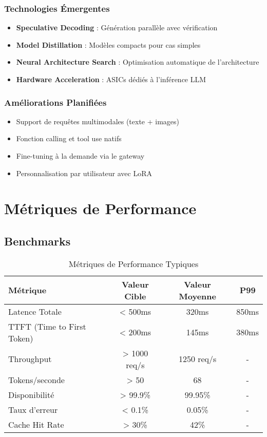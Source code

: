 \documentclass[12pt,a4paper]{article}
\begin{document}
\subsubsection{Technologies Émergentes}
\begin{itemize}[noitemsep]
    \item \textbf{Speculative Decoding} : Génération parallèle avec vérification
    \item \textbf{Model Distillation} : Modèles compacts pour cas simples
    \item \textbf{Neural Architecture Search} : Optimisation automatique de l'architecture
    \item \textbf{Hardware Acceleration} : ASICs dédiés à l'inférence LLM
\end{itemize}

\subsubsection{Améliorations Planifiées}
\begin{itemize}[noitemsep]
    \item Support de requêtes multimodales (texte + images)
    \item Fonction calling et tool use natifs
    \item Fine-tuning à la demande via le gateway
    \item Personnalisation par utilisateur avec LoRA
\end{itemize}

\newpage
\section{Métriques de Performance}

\subsection{Benchmarks}

\begin{table}[h]
\centering
\begin{tabular}{|l|c|c|c|}
\hline
\textbf{Métrique} & \textbf{Valeur Cible} & \textbf{Valeur Moyenne} & \textbf{P99} \\
\hline
Latence Totale & < 500ms & 320ms & 850ms \\
TTFT (Time to First Token) & < 200ms & 145ms & 380ms \\
Throughput & > 1000 req/s & 1250 req/s & - \\
Tokens/seconde & > 50 & 68 & - \\
Disponibilité & > 99.9\% & 99.95\% & - \\
Taux d'erreur & < 0.1\% & 0.05\% & - \\
Cache Hit Rate & > 30\% & 42\% & - \\
\hline
\end{tabular}
\caption{Métriques de Performance Typiques}
\end{table}
\end{document}
